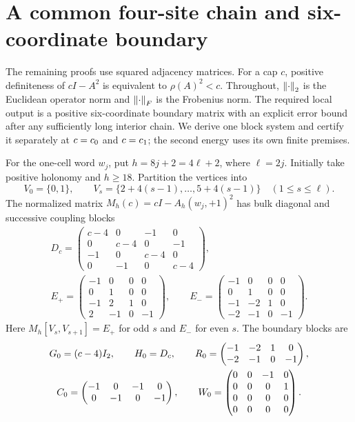 \section{A common four-site chain and six-coordinate boundary}
\label{sec:chain}

The remaining proofs use squared adjacency matrices. For a cap $c$,
positive definiteness of $cI-A^2$ is equivalent to $\rho(A)^2<c$.
Throughout, $\left\lVert\cdot\right\rVert_2$ is the Euclidean operator norm and
$\left\lVert\cdot\right\rVert_F$ is the Frobenius norm.
The required local output is a positive six-coordinate boundary matrix
with an explicit error bound after any sufficiently long interior chain.
We derive one block system and certify it separately at $c=c_0$ and
$c=c_1$; the second energy uses its own finite premises.

For the one-cell word $w_j$, put $h=8j+2=4\ell+2$, where $\ell=2j$.
Initially take positive holonomy and $h\ge18$. Partition the vertices into
\[
 V_0=\{0,1\},\qquad
 V_s=\{2+4(s-1),\ldots,5+4(s-1)\}\quad(1\le s\le\ell).
\]
The normalized matrix $M_h(c)=cI-A_h(w_j,+1)^2$ has bulk diagonal and
successive coupling blocks
\begin{gather}
 D_c=\begin{pmatrix}
 c-4&0&-1&0\\0&c-4&0&-1\\-1&0&c-4&0\\0&-1&0&c-4
 \end{pmatrix},\label{eq:D}\\
 E_+=\begin{pmatrix}-1&0&0&0\\0&1&0&0\\-1&2&1&0\\2&-1&0&-1\end{pmatrix},
 \qquad
 E_-=\begin{pmatrix}-1&0&0&0\\0&1&0&0\\-1&-2&1&0\\-2&-1&0&-1\end{pmatrix}.
 \label{eq:E}
\end{gather}
Here $M_h[V_s,V_{s+1}]=E_+$ for odd $s$ and $E_-$ for even $s$.
The boundary blocks are
\begin{gather}
 G_0=(c-4)I_2,\qquad H_0=D_c,\qquad
 R_0=\begin{pmatrix}-1&-2&1&0\\-2&-1&0&-1\end{pmatrix},\notag\\
 C_0=\begin{pmatrix}-1&0&-1&0\\0&-1&0&-1\end{pmatrix},\qquad
 W_0=\begin{pmatrix}0&0&-1&0\\0&0&0&1\\0&0&0&0\\0&0&0&0\end{pmatrix}.
 \label{eq:boundary-data}
\end{gather}
